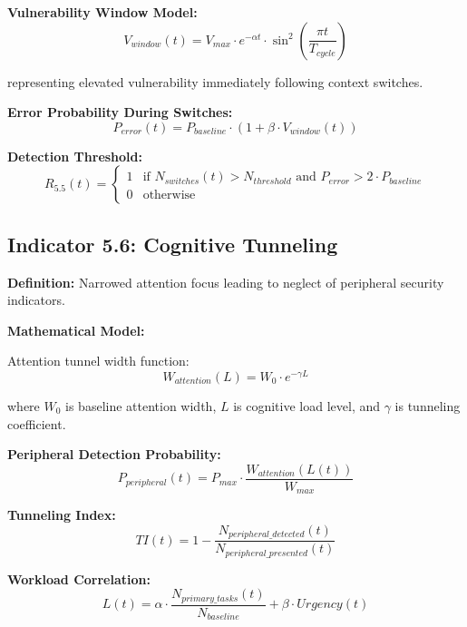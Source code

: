 \documentclass[11pt,a4paper]{article}
\begin{document}
\textbf{Vulnerability Window Model:}
\begin{equation}
V_{window}(t) = V_{max} \cdot e^{-\alpha t} \cdot \sin^2\left(\frac{\pi t}{T_{cycle}}\right)
\end{equation}

representing elevated vulnerability immediately following context switches.

\textbf{Error Probability During Switches:}
\begin{equation}
P_{error}(t) = P_{baseline} \cdot \left(1 + \beta \cdot V_{window}(t)\right)
\end{equation}

\textbf{Detection Threshold:}
\begin{equation}
R_{5.5}(t) = \begin{cases}
1 & \text{if } N_{switches}(t) > N_{threshold} \text{ and } P_{error} > 2 \cdot P_{baseline} \\
0 & \text{otherwise}
\end{cases}
\end{equation}

\subsection{Indicator 5.6: Cognitive Tunneling}

\textbf{Definition:} Narrowed attention focus leading to neglect of peripheral security indicators.

\textbf{Mathematical Model:}

Attention tunnel width function:
\begin{equation}
W_{attention}(L) = W_0 \cdot e^{-\gamma L}
\end{equation}

where $W_0$ is baseline attention width, $L$ is cognitive load level, and $\gamma$ is tunneling coefficient.

\textbf{Peripheral Detection Probability:}
\begin{equation}
P_{peripheral}(t) = P_{max} \cdot \frac{W_{attention}(L(t))}{W_{max}}
\end{equation}

\textbf{Tunneling Index:}
\begin{equation}
TI(t) = 1 - \frac{N_{peripheral\_detected}(t)}{N_{peripheral\_presented}(t)}
\end{equation}

\textbf{Workload Correlation:}
\begin{equation}
L(t) = \alpha \cdot \frac{N_{primary\_tasks}(t)}{N_{baseline}} + \beta \cdot Urgency(t)
\end{equation}
\end{document}
